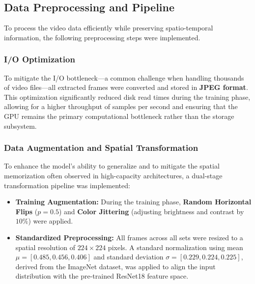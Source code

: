 \subsection{Data Preprocessing and Pipeline}
To process the video data efficiently while preserving spatio-temporal information, the following preprocessing steps were implemented.

\subsubsection{I/O Optimization}
To mitigate the I/O bottleneck—a common challenge when handling thousands of video files—all extracted frames were converted and stored in \textbf{JPEG format}. This optimization significantly reduced disk read times during the training phase, allowing for a higher throughput of samples per second and ensuring that the GPU remains the primary computational bottleneck rather than the storage subsystem.

\subsubsection{Data Augmentation and Spatial Transformation}
To enhance the model's ability to generalize and to mitigate the spatial memorization often observed in high-capacity architectures, a dual-stage transformation pipeline was implemented:
\begin{itemize}
    \item \textbf{Training Augmentation:} During the training phase, \textbf{Random Horizontal Flips} ($p=0.5$) and \textbf{Color Jittering} (adjusting brightness and contrast by $10\%$) were applied. 
    \item \textbf{Standardized Preprocessing:} All frames across all sets were resized to a spatial resolution of $224 \times 224$ pixels. A standard normalization using mean $\mu = [0.485, 0.456, 0.406]$ and standard deviation $\sigma = [0.229, 0.224, 0.225]$, derived from the ImageNet dataset, was applied to align the input distribution with the pre-trained ResNet18 feature space.
\end{itemize}

